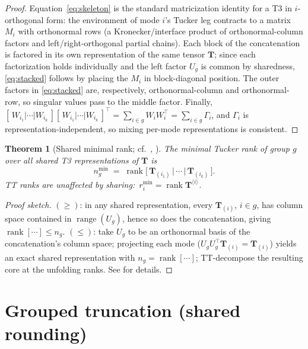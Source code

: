 \documentclass[11pt]{article}
\newtheorem{theorem}{Theorem}[section]
\theoremstyle{definition}
\theoremstyle{remark}
\newcommand{\T}{\boldsymbol{T}}
\newcommand{\rank}{\operatorname{rank}}
\begin{document}
\begin{proof}
Equation~\eqref{eq:skeleton} is the standard matricization identity for a T3
in $i$-orthogonal form: the environment of mode $i$'s Tucker leg contracts to
a matrix $M_i$ with orthonormal rows (a Kronecker/interface product of
orthonormal-column factors and left/right-orthogonal partial chains).
Each block of the concatenation is factored in its own representation of the
same tensor $\T$; since each factorization holds individually and the left
factor $U_g$ is common by sharedness, \eqref{eq:stacked} follows by placing
the $M_i$ in block-diagonal position. The outer factors in \eqref{eq:stacked}
are, respectively, orthonormal-column and orthonormal-row, so singular values
pass to the middle factor. Finally,
$[\,W_{i_1}|\cdots|W_{i_k}\,][\,W_{i_1}|\cdots|W_{i_k}\,]^\top
= \sum_{i\in g} W_i W_i^\top = \sum_{i\in g} \Gamma_i$, and $\Gamma_i$ is
representation-independent, so mixing per-mode representations is consistent.
\end{proof}

\begin{theorem}[Shared minimal rank; cf.~{\cite[Thm.~1]{MR2026}},
{\cite{Pesh2024}}]\label{thm:sharedrank}
The minimal Tucker rank of group $g$ over all shared T3 representations of
$\T$ is
\[
n_g^{\min} \;=\; \rank\bigl[\,\T_{(i_1)} \,|\, \cdots \,|\, \T_{(i_k)}\,\bigr].
\]
TT ranks are unaffected by sharing:\ $r_i^{\min} = \rank \T^{\langle i\rangle}$.
\end{theorem}

\begin{proof}[Proof sketch]
$(\geq)$: in any shared representation, every $\T_{(i)}$, $i \in g$, has
column space contained in $\operatorname{range}(U_g)$, hence so does the
concatenation, giving $\rank[\cdots] \leq n_g$.
$(\leq)$: take $U_g$ to be an orthonormal basis of the concatenation's column
space; projecting each mode ($U_g U_g^\top \T_{(i)} = \T_{(i)}$) yields an
exact shared representation with $n_g = \rank[\cdots]$; TT-decompose the
resulting core at the unfolding ranks. See \cite{MR2026,Pesh2024} for
details.
\end{proof}

\section{Grouped truncation (shared rounding)}\label{sec:rounding}
\end{document}
